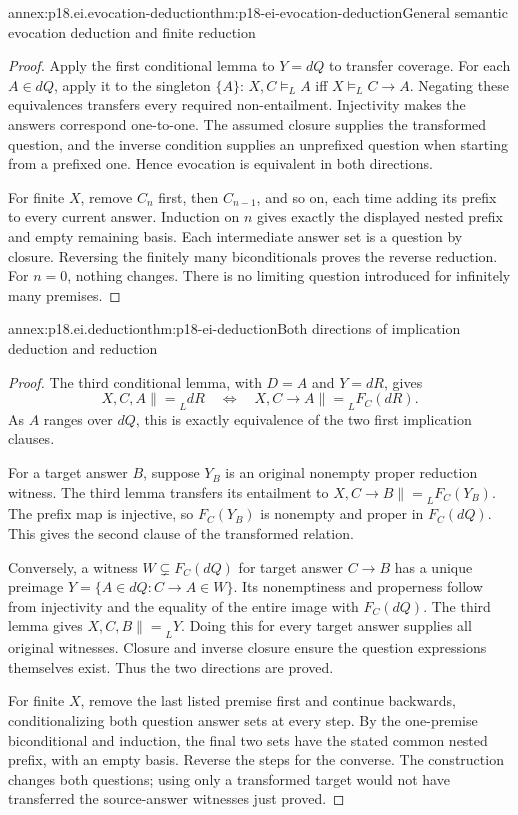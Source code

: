 \begin{annexitem}{annex:p18.ei.evocation-deduction}{thm:p18-ei-evocation-deduction}{General semantic evocation deduction and finite reduction}
\begin{proof}
Apply the first conditional lemma to \(Y=dQ\) to transfer coverage.
For each \(A\in dQ\), apply it to the singleton \(\{A\}\):
\(X,C\models_L A\) iff \(X\models_L C\to A\). Negating these
equivalences transfers every required non-entailment. Injectivity makes the
answers correspond one-to-one. The assumed closure supplies the transformed
question, and the inverse condition supplies an unprefixed question when
starting from a prefixed one. Hence evocation is equivalent in both directions.

For finite \(X\), remove \(C_n\) first, then \(C_{n-1}\), and so on,
each time adding its prefix to every current answer. Induction on \(n\)
gives exactly the displayed nested prefix and empty remaining basis. Each
intermediate answer set is a question by closure. Reversing the finitely many
biconditionals proves the reverse reduction. For \(n=0\), nothing changes.
There is no limiting question introduced for infinitely many premises.
\end{proof}
\end{annexitem}

\begin{annexitem}{annex:p18.ei.deduction}{thm:p18-ei-deduction}{Both directions of implication deduction and reduction}
\begin{proof}
The third conditional lemma, with \(D=A\) and \(Y=dR\), gives
\[
 X,C,A\mathrel{\|=}_L dR
 \quad\Longleftrightarrow\quad
 X,C\to A\mathrel{\|=}_L F_C(dR).
\]
As \(A\) ranges over \(dQ\), this is exactly equivalence of the two
first implication clauses.

For a target answer \(B\), suppose \(Y_B\) is an original nonempty proper
reduction witness. The third lemma transfers its entailment to
\(X,C\to B\mathrel{\|=}_L F_C(Y_B)\). The prefix map is injective, so
\(F_C(Y_B)\) is nonempty and proper in \(F_C(dQ)\). This gives the
second clause of the transformed relation.

Conversely, a witness \(W\subsetneq F_C(dQ)\) for target answer
\(C\to B\) has a unique preimage
\(Y=\{A\in dQ:C\to A\in W\}\). Its nonemptiness and properness
follow from injectivity and the equality of the entire image with
\(F_C(dQ)\). The third lemma gives
\(X,C,B\mathrel{\|=}_L Y\). Doing this for every target answer supplies
all original witnesses. Closure and inverse closure ensure the question
expressions themselves exist. Thus the two directions are proved.

For finite \(X\), remove the last listed premise first and continue
backwards, conditionalizing both question answer sets at every step. By the
one-premise biconditional and induction, the final two sets have the stated
common nested prefix, with an empty basis. Reverse the steps for the converse.
The construction changes both questions; using only a transformed target
would not have transferred the source-answer witnesses just proved.
\end{proof}
\end{annexitem}

